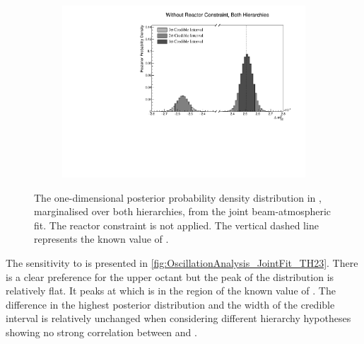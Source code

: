\begin{figure}[h]
  \begin{subfigure}[t]{0.98\textwidth}
    \includegraphics[width=\textwidth, trim={0mm 0mm 0mm 0mm}, clip,page=1]{Figures/OA/JointFit/Contours_1D_dm32_BH_1_woRC_UnSmeared_CredibleInterval.pdf}
  \end{subfigure}
  \caption{The one-dimensional posterior probability density distribution in , marginalised over both hierarchies, from the joint beam-atmospheric fit. The reactor constraint is not applied. The vertical dashed line represents the known value of .}
  \label{fig:OscillationAnalysis_JointFit_DELM32}
\end{figure}

The sensitivity to  is presented in \autoref{fig:OscillationAnalysis_JointFit_TH23}. There is a clear preference for the upper octant but the peak of the distribution is relatively flat. It peaks at  which is in the region of the known value of . The difference in the highest posterior distribution and the width of the credible interval is relatively unchanged when considering different hierarchy hypotheses showing no strong correlation between  and .

